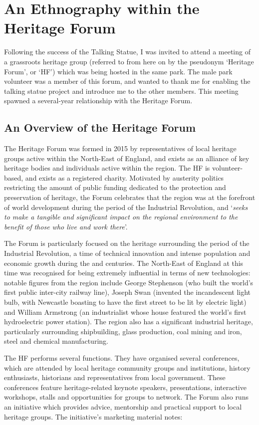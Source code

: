 \section{An Ethnography within the Heritage Forum}

Following the success of the Talking Statue, I was invited to attend a meeting of a grassroots heritage group (referred to from here on by the pseudonym `Heritage Forum', or `HF') which was being hosted in the same park. The male park volunteer was a member of this forum, and wanted to thank me for enabling the talking statue project and introduce me to the other members. This meeting spawned a several-year relationship with the Heritage Forum.

\subsection{An Overview of the Heritage Forum}
The Heritage Forum was formed in 2015 by representatives of local heritage groups active within the North-East of England, and exists as an alliance of key heritage bodies and individuals active within the region. The HF is volunteer-based, and exists as a registered charity. Motivated by austerity politics restricting the amount of public funding dedicated to the protection and preservation of heritage, the Forum celebrates that the region was at the forefront of world development during the period of the Industrial Revolution, and `\textit{seeks to make a tangible and significant impact on the regional environment to the benefit of those who live and work there}'.

The Forum is particularly focused on the heritage surrounding the period of the Industrial Revolution, a time of technical innovation and intense population and economic growth during the  and  centuries. The North-East of England at this time was recognised for being extremely influential in terms of new technologies: notable figures from the region include George Stephenson (who built the world's first public inter-city railway line), Joseph Swan (invented the incandescent light bulb, with Newcastle boasting to have the first street to be lit by electric light) and William Armstrong (an industrialist whose house featured the world's first hydroelectric power station). The region also has a significant industrial heritage, particularly surrounding shipbuilding, glass production, coal mining and iron, steel and chemical manufacturing. 

The HF performs several functions. They have organised several conferences, which are attended by local heritage community groups and institutions, history enthusiasts, historians and representatives from local government. These conferences feature heritage-related keynote speakers, presentations, interactive workshops, stalls and opportunities for groups to network. The Forum also runs an initiative which provides advice, mentorship and practical support to local heritage groups. The initiative's marketing material notes:

